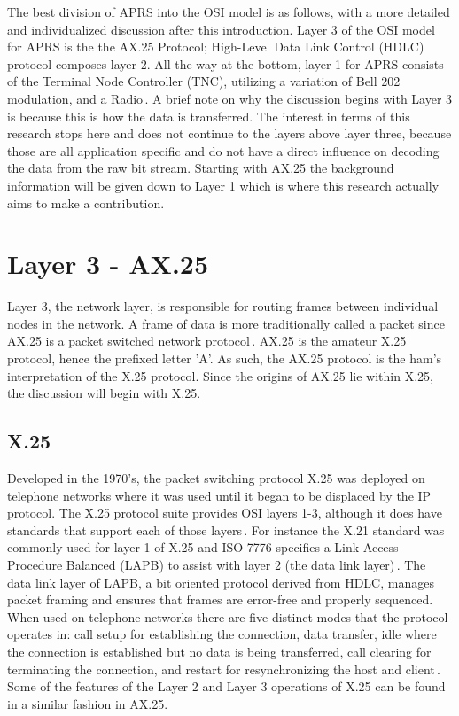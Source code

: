 The best division of APRS into the OSI model is as follows, with a more detailed and individualized discussion after this introduction. Layer 3 of the OSI model for APRS is the the AX.25 Protocol; High-Level Data Link Control (HDLC) protocol composes layer 2. All the way at the bottom, layer 1 for APRS consists of the Terminal Node Controller (TNC), utilizing a variation of Bell 202 modulation, and a Radio\,\cite{Silver2013}. A brief note on why the discussion begins with Layer 3 is because this is how the data is transferred. The interest in terms of this research stops here and does not continue to the layers above layer three, because those are all application specific and do not have a direct influence on decoding the data from the raw bit stream. Starting with AX.25 the background information will be given down to Layer 1 which is where this research actually aims to make a contribution.

\section{Layer 3 - AX.25}
Layer 3, the network layer, is responsible for routing frames between individual nodes in the network. A frame of data is more traditionally called a packet since AX.25 is a packet switched network protocol\,\cite{Peterson2011}. AX.25 is the amateur X.25 protocol, hence the prefixed letter 'A'. As such, the AX.25 protocol is the ham's interpretation of the X.25 protocol. Since the origins of AX.25 lie within X.25, the discussion will begin with X.25. 

\subsection{X.25}
Developed in the 1970's, the packet switching protocol X.25 was deployed on telephone networks where it was used until it began to be displaced by the IP protocol. The X.25 protocol suite provides OSI layers 1-3, although it does have standards that support each of those layers\,\cite{Sosinsky2009}. For instance the X.21 standard was commonly used for layer 1 of X.25 and ISO 7776 specifies a Link Access Procedure Balanced (LAPB) to assist with layer 2 (the data link layer)\,\cite{Gallagher1997}. The data link layer of LAPB, a bit oriented protocol derived from HDLC,  manages packet framing and ensures that frames are error-free and properly sequenced. When used on telephone networks there are five distinct modes that the protocol operates in: call setup for establishing the connection, data transfer, idle where the connection is established but no data is being transferred, call clearing for terminating the connection, and restart for resynchronizing the host and client\,\cite{Javvin2006}. Some of the features of the Layer 2 and Layer 3 operations of X.25 can be found in a similar fashion in AX.25.

